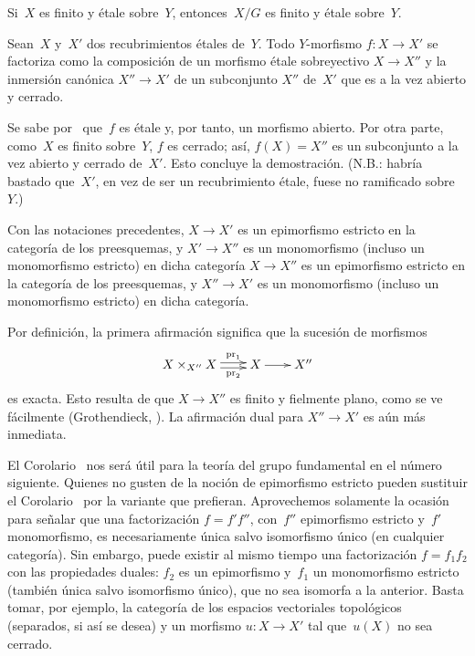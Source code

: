 \begin{corollaire}
\label{V.3.4}
Si~$X$ es finito y étale sobre~$Y$, entonces~$X/G$ es finito y étale
sobre~$Y$.
\end{corollaire}

\begin{proposition}
\label{V.3.5}
Sean~$X$ y~$X'$ dos recubrimientos étales de~$Y$. Todo $Y$-morfismo
$f\colon X\to X'$ se factoriza como la composición de un morfismo étale
sobreyectivo $X\to X''$ y la inmersión canónica $X''\to X'$ de un subconjunto
$X''$ de~$X'$ que es a la vez abierto y cerrado.
\end{proposition}

Se sabe por~ que~$f$ es étale y, por tanto, un morfismo abierto. Por
otra parte, como~$X$ es finito sobre~$Y$, $f$ es cerrado; así,
$f(X)=X''$ es un subconjunto a la vez abierto y cerrado de~$X'$. Esto concluye
la demostración. (N.B.: habría bastado que~$X'$, en vez de ser un recubrimiento
étale, fuese no ramificado sobre~$Y$.)

\begin{corollaire}
\label{V.3.6}
Con las notaciones precedentes,
{$X\to X'$ es un epimorfismo estricto en la categoría de los preesquemas, y
$X'\to X''$ es un monomorfismo (incluso un monomorfismo estricto) en dicha
categoría}
{$X\to X''$ es un epimorfismo estricto en la categoría de los preesquemas, y
$X''\to X'$ es un monomorfismo (incluso un monomorfismo estricto) en dicha
categoría}.
\end{corollaire}

Por definición, la primera afirmación significa que la sucesión de morfismos
\begingroup
\shorthandoff{<>}%
$$
\xymatrix@C=.7cm{X \times_{X''} X \ar@<2pt>[r]^-{\pr_1}
\ar@<-2pt>[r]_-{\pr_2} & X \ar[r] & X''}
$$
\endgroup
es exacta. Esto resulta de que $X\to X''$ es finito y fielmente plano, como se
ve fácilmente (\cf Grothendieck, \loccit). La afirmación dual para
$X''\to X'$ es aún más inmediata.

El Corolario~ nos será útil para la teoría del grupo fundamental en
el número siguiente. Quienes no gusten de la noción de epimorfismo estricto
pueden sustituir el Corolario~ por la variante que prefieran.
Aprovechemos solamente la ocasión para señalar que una factorización
$f=f'f''$, con~$f''$ epimorfismo estricto y~$f'$ monomorfismo, es
necesariamente única salvo isomorfismo único (en cualquier categoría). Sin
embargo, puede existir al mismo tiempo una factorización $f=f_1f_2$ con las
propiedades duales: $f_2$ es un epimorfismo y~$f_1$ un monomorfismo estricto
(también única salvo isomorfismo único), que no sea isomorfa a la anterior.
Basta tomar, por ejemplo, la categoría de los espacios vectoriales topológicos
(separados, si así se desea) y un morfismo $u\colon X\to X'$ tal que~$u(X)$ no
sea cerrado.

